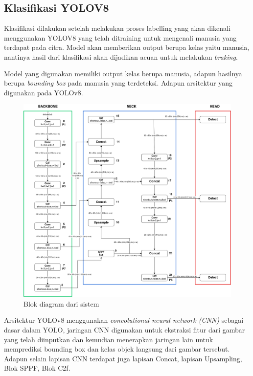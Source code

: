 
\subsection{Klasifikasi YOLOV8}
Klasifikasi dilakukan setelah melakukan proses labelling yang akan dikenali menggunakan YOLOV8 yang telah ditraining untuk mengenali manusia yang terdapat pada citra. Model akan memberikan output berupa kelas yaitu manusia, nantinya hasil dari klasifikasi akan dijadikan acuan untuk melakukan \emph{braking}.

Model yang digunakan memiliki output kelas berupa manusia, adapun hasilnya berupa \emph{bounding box} pada manusia yang terdeteksi. Adapun arsitektur yang digunakan pada YOLOv8.

\begin{figure} [H] \centering
  \includegraphics[scale=0.25]{gambar/yolov8.png}
  \caption{Blok diagram dari sistem}
  \label{fig:rancangan penelitian}
\end{figure}
 Arsitektur YOLOv8 menggunakan \emph{convolutional neural network (CNN)} sebagai dasar dalam YOLO, jaringan CNN digunakan untuk ekstraksi fitur dari gambar yang telah diinputkan dan kemudian menerapkan jaringan lain untuk memprediksi bounding box dan kelas objek langsung dari gambar tersebut. Adapun selain lapisan CNN terdapat juga lapisan Concat, lapisan Upsampling, Blok SPPF, Blok C2f.

